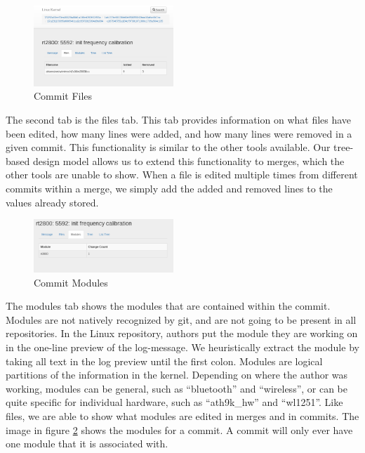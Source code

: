 \documentclass[conference, draftclsnofoot]{IEEEtran}
\begin{document}
\begin{figure}[h]
	\centering
	\includegraphics[width=0.47\textwidth]{figures/file_view.png}
	\caption{Commit Files}
	\label{fig:files}
\end{figure}

The second tab is the files tab. This tab provides information on what files
have been edited, how many lines were added, and how many lines were removed in
a given commit. This functionality is similar to the other tools available. Our
tree-based design model allows us to extend this functionality to merges, which
the other tools are unable to show. When a file is edited multiple times from
different commits within a merge, we simply add the added and removed lines to
the values already stored. 

\begin{figure}[h]
	\centering
	\includegraphics[width=0.47\textwidth]{figures/modules.png}
	\caption{Commit Modules}
	\label{fig:modules}
\end{figure}

The modules tab shows the modules that are contained within the commit. Modules
are not natively recognized by git, and are not going to be present in all
repositories. In the Linux repository, authors put the module they are working
on in the one-line preview of the log-message.  We heuristically extract the
module by taking all text in the log preview until the first colon. Modules are
logical partitions of the information in the kernel. Depending on where the
author was working, modules can be general, such as ``bluetooth'' and
``wireless'', or can be quite specific for individual hardware, such as
``ath9k\_hw'' and ``wl1251''. Like files, we are able to show what modules are
edited in merges and in commits. The image in figure \ref{fig:modules} shows
the modules for a commit. A commit will only ever have one module that it is
associated with.
\end{document}
